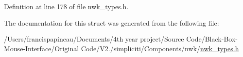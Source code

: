 \-Definition at line 178 of file nwk\-\_\-types.\-h.



\-The documentation for this struct was generated from the following file\-:\begin{DoxyCompactItemize}
\item 
/\-Users/francispapineau/\-Documents/4th year project/\-Source Code/\-Black-\/\-Box-\/\-Mouse-\/\-Interface/\-Original Code/\-V2./simpliciti/\-Components/nwk/\hyperlink{nwk__types_8h}{nwk\-\_\-types.\-h}\end{DoxyCompactItemize}
